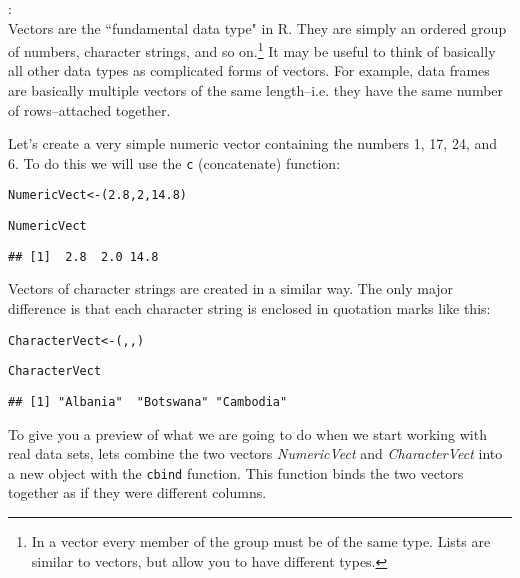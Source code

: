: \\[0.25cm] Vectors are the ``fundamental data type"\cite{Matloff2011} in R. They are simply an ordered group of numbers, character strings, and so on.\footnote{In a vector every member of the group must be of the same type. Lists are similar to vectors, but allow you to have different types.} It may be useful to think of basically all other data types as complicated forms of vectors. For example, data frames are basically multiple vectors of the same length--i.e. they have the same number of rows--attached together. 

Let's create a very simple numeric vector containing the numbers 1, 17, 24, and 6. To do this we will use the \texttt{c} (concatenate) function:

\begin{knitrout}
\color{fgcolor}\begin{kframe}
\begin{alltt}
NumericVect <- (2.8, 2, 14.8)

NumericVect
\end{alltt}
\begin{verbatim}
## [1]  2.8  2.0 14.8
\end{verbatim}
\end{kframe}
\end{knitrout}


Vectors of character strings are created in a similar way. The only major difference is that each character string is enclosed in quotation marks like this:

\begin{knitrout}
\color{fgcolor}\begin{kframe}
\begin{alltt}
CharacterVect <- (, , )

CharacterVect
\end{alltt}
\begin{verbatim}
## [1] "Albania"  "Botswana" "Cambodia"
\end{verbatim}
\end{kframe}
\end{knitrout}


To give you a preview of what we are going to do when we start working with real data sets, lets combine the two vectors {\emph{NumericVect}} and {\emph{CharacterVect}} into a new object with the \texttt{cbind} function. This function binds the two vectors together as if they were different columns.

















